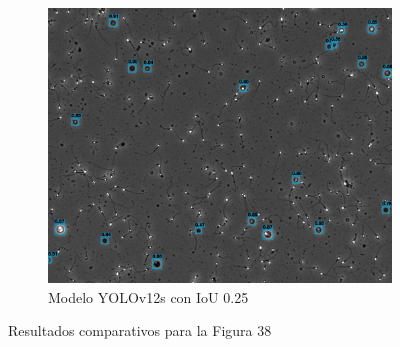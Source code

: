 \documentclass[12pt,a4paper,onecolumn,oneside]{report}
\begin{document}
\begin{figure}[H]
  \vspace{0.3cm}
  \begin{subfigure}[b]{0.48\textwidth}
    \centering
    \includegraphics[width=\textwidth]{figuras/evaluacion_cualitativa/38/38_v12_IoU0.25.jpg}
    \caption{Modelo YOLOv12s con IoU 0.25}
    \label{figyolov12s_IoU0.25_image_38}
  \end{subfigure}
  
  \caption{Resultados comparativos para la Figura 38}
  \label{fig:38}
\end{figure}
\end{document}
